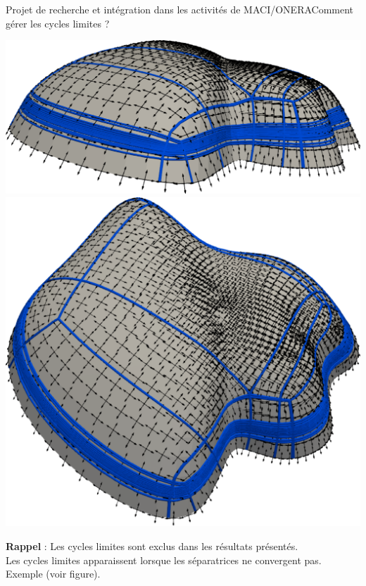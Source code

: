 \documentclass[compress,10pt,aspectratio=169]{beamer}
\begin{document}
\begin{frame}{\large Projet de recherche et intégration dans les activités de MACI/ONERA}{Comment gérer les cycles limites ?}
\small
\vspace{-0.5cm}
\begin{center}
\includegraphics[scale=0.15]{images/cycle_limit_1.pdf}\hspace{0.8cm}
\includegraphics[scale=0.15]{images/cycle_limit_2.pdf}
\end{center}
\textbf{Rappel} : Les cycles limites sont exclus dans les résultats présentés.\\\vspace{0.1cm}
Les cycles limites apparaissent lorsque les séparatrices ne convergent pas. Exemple (voir figure).\\\vspace{0.1cm}

\end{frame}
\end{document}
